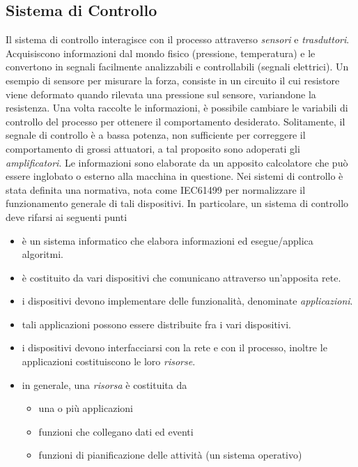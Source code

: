 \documentclass[10pt, letterpaper]{report}
\begin{document}
\subsection{Sistema di Controllo}
Il sistema di controllo interagisce con il processo 
attraverso \textit{sensori} e \textit{trasduttori}. Acquisiscono 
informazioni dal mondo fisico (pressione, temperatura) e le convertono in segnali 
facilmente analizzabili e controllabili (segnali elettrici).
\acc 
Un esempio di sensore per misurare la forza, consiste in un circuito il cui
resistore viene deformato quando rilevata una pressione sul sensore, 
variandone la resistenza.\acc 
Una volta raccolte le informazioni, è possibile cambiare le variabili 
di controllo del processo per ottenere il comportamento desiderato. Solitamente, 
il segnale di controllo è a bassa potenza, non sufficiente per correggere il comportamento 
di grossi attuatori, a tal proposito sono adoperati gli \textit{amplificatori}. Le informazioni 
sono elaborate da un apposito calcolatore che può essere inglobato o 
esterno alla macchina in questione.\acc
Nei sistemi di controllo è stata definita una normativa, nota come 
IEC61499 per normalizzare il funzionamento generale di tali 
dispositivi. In particolare,  un sistema di controllo deve 
rifarsi ai seguenti punti\begin{itemize}
    \item è un sistema informatico che elabora informazioni ed 
    esegue/applica algoritmi.
    \item è costituito da vari dispositivi che comunicano attraverso un'apposita 
    rete. 
    \item i dispositivi devono implementare delle funzionalità, denominate \textit{applicazioni}.
    \item tali applicazioni possono essere distribuite fra i vari dispositivi. 
    \item i dispositivi devono interfacciarsi con la rete e con il processo, 
    inoltre le applicazioni costituiscono le loro \textit{risorse}.
    \item in generale, una \textit{risorsa} è costituita da\begin{itemize}
        \item una o più applicazioni 
        \item funzioni che collegano dati ed eventi 
        \item funzioni di pianificazione delle attività (un sistema operativo)
    \end{itemize}
\end{itemize}
\end{document}
